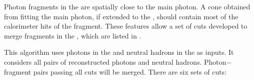 Photon fragments in the \HCAL are  spatially close to the main photon. A cone obtained from fitting the main photon, if extended to the \HCAL, should contain most of the calorimeter hits of the fragment. These features allow a set of cuts developed to merge  fragments in the \HCAL, which are listed in .


This algorithm uses photons in the \ECAL and neutral hadrons in the \HCAL as inputs. It considers all pairs of reconstructed photons and neutral hadrons. Photon$-$fragment pairs passing all cuts will be merged. There are six sets of cuts:


